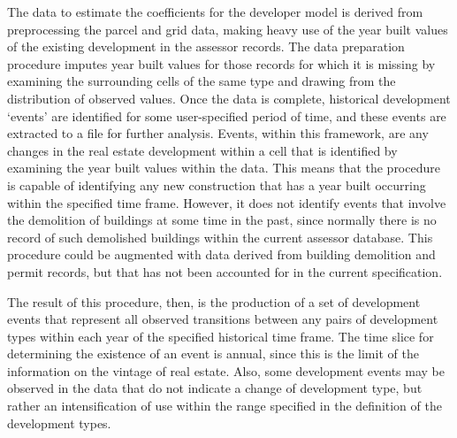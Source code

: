 \documentclass[fleqn]{article}
\begin{document}
The data to estimate the coefficients for the developer model is
derived from preprocessing the parcel and grid data, making heavy
use of the year built values of the existing development in the
assessor records.  The data preparation procedure imputes year
built values for those records for which it is missing by examining the
surrounding cells of the same type and drawing from the
distribution of observed values.  Once the data is complete,
historical development `events' are identified for some
user-specified period of time, and these events are extracted to a
file for further analysis.  Events, within this framework, are any
changes in the real estate development within a cell that is
identified by examining the year built values within the data.
This means that the procedure is capable of identifying any new
construction that has a year built occurring within the specified
time frame.  However, it does not identify events that involve
the demolition of buildings at some time in the past,
since normally there is no record of such demolished buildings
within the current assessor database.  This procedure
could be augmented with data derived from building demolition and
permit records, but that has not been accounted for in the current
specification.

The result of this procedure, then, is the production of a set of
development events that represent all observed transitions between
any pairs of development types within each year of the specified
historical time frame.  The time slice for determining
the existence of an event is annual, since this is the limit of
the information on the vintage of real estate.  Also, some
development events may be observed in the data that do not indicate a
change of development type, but rather an intensification of use
within the range specified in the definition of the development
types.
\end{document}
